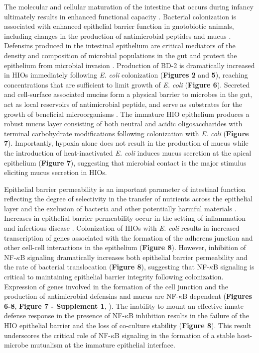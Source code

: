 \documentclass[9pt,lineo]{elife}
\begin{document}
The molecular and cellular maturation of the intestine that occurs during infancy ultimately results in enhanced functional capacity \citep{Lebenthal:1999,sanderson2000development,Neu:2007}. Bacterial colonization is associated with enhanced epithelial barrier function in gnotobiotic animals, including changes in the production of antimicrobial peptides and mucus \citep{Vaishnava:2008,Cash:2006,Goto:2014,Garcia-Lafuente:2001,Malago:2015,Menard:2008}. Defensins produced in the intestinal epithelium are critical mediators of the density and composition of microbial populations in the gut and protect the epithelium from microbial invasion \citep{Ostaff:2013,Cullen:2015,Salzman:2003,Salzman:2010}. Production of BD-2 is dramatically increased in HIOs immediately following \emph{E. coli} colonization (\textbf{Figures 2} and \textbf{5}), reaching concentrations that are sufficient to limit growth of \emph{E. coli} (\textbf{Figure 6}). Secreted and cell-surface associated mucins form a physical barrier to microbes in the gut, act as local reservoirs of antimicrobial peptide, and serve as substrates for the growth of beneficial microorganisms \citep{Desai:2016,Johansson:2016,Cornick:2015,Hansson:2012,Li:2015,Dupont:2014,Bergstrom:2013}. The immature HIO epithelium produces a robust mucus layer consisting of both neutral and acidic oligosaccharides with terminal carbohydrate modifications following colonization with \emph{E. coli} (\textbf{Figure 7}). Importantly, hypoxia alone does not result in the production of mucus while the introduction of heat-inactivated \emph{E. coli} induces mucus secretion at the apical epithelium (\textbf{Figure 7}), suggesting that microbial contact is the major stimulus eliciting mucus secretion in HIOs.

Epithelial barrier permeability is an important parameter of intestinal function reflecting the degree of selectivity in the transfer of nutrients across the epithelial layer and the exclusion of bacteria and other potentially harmful materials \citep{Bischoff:2014}. Increases in epithelial barrier permeability occur in the setting of inflammation \citep{Ahmad:2017,Michielan:2015} and infectious disease \citep{Shawki:2017}. Colonization of HIOs with \emph{E. coli} results in increased transcription of genes associated with the formation of the adherens junction and other cell-cell interactions in the epithelium (\textbf{Figure 8}). However, inhibition of NF-\(\kappa\)B signaling dramatically increases both epithelial barrier permeability and the rate of bacterial translocation (\textbf{Figure 8}), suggesting that NF-\(\kappa\)B signaling is critical to maintaining epithelial barrier integrity following colonization. Expression of genes involved in the formation of the cell junction and the production of antimicrobial defensins and mucus are NF-\(\kappa\)B dependent (\textbf{Figures 6-8}, \textbf{Figure 7 - Supplement 1},  \citealt{Tsutsumi-Ishii:2002,Ahn:2005}). The inability to mount an effective innate defense response in the presence of NF-\(\kappa\)B inhibition results in the failure of the HIO epithelial barrier and the loss of co-culture stability (\textbf{Figure 8}). This result underscores the critical role of NF-\(\kappa\)B signaling in the formation of a stable host-microbe mutualism at the immature epithelial interface.
\end{document}
